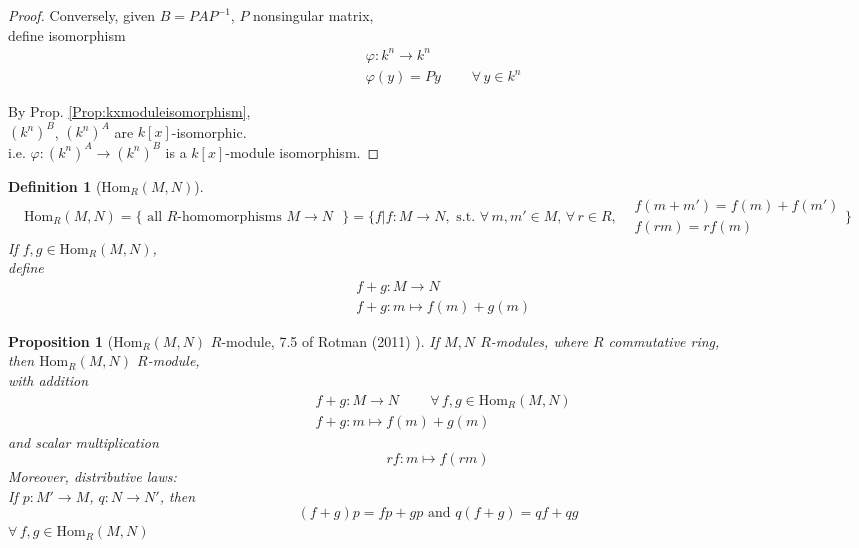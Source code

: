 \documentclass[10pt]{amsart}
\newtheorem{proposition}{Proposition}
\newtheorem{definition}{Definition}
\begin{document}
\begin{multicols*}{2}
\begin{proof}
Conversely, given $B=PAP^{-1}$, $P$ nonsingular matrix,  \\
define isomorphism 
\[
\begin{aligned}
& \varphi :k^n \to k^n \\ 
& \varphi(y) = Py \qquad \  \forall \, y \in k^n
\end{aligned}
\]

By Prop. \ref{Prop:kxmoduleisomorphism}, \\
$(k^n)^B$, $(k^n)^A$ are $k[x]$-isomorphic.  \\
i.e. $\varphi : (k^n)^A \to (k^n)^B $ is a $k[x]$-module isomorphism.  


	\end{proof}

\begin{definition}[$\text{Hom}_R(M,N)$]
\begin{equation}
\text{Hom}_R(M,N) = \lbrace \text{ all $R$-homomorphisms $M\to N$ } \rbrace = \lbrace f | f:M\to N , \text{ s.t. } \forall \, m,m' \in M, \, \forall \, r \in R, \begin{aligned} & f(m+m') =f(m) + f(m') \\ & f(rm) = rf(m) \end{aligned} \rbrace
\end{equation}
If $f,g \in \text{Hom}_R(M,N)$, \\
define
\begin{equation}
\begin{aligned}
& f+g:M \to N \\
& f+g:m\mapsto f(m) + g(m)
\end{aligned}
\end{equation}
\end{definition}

\begin{proposition}[$\text{Hom}_R(M,N)$ $R$-module, 7.5 of Rotman (2011)  \cite{JRotman2010}]
	If $M,N$ $R$-modules, where $R$ commutative ring, \\
	then $\text{Hom}_R(M,N)$ $R$-module, \\
	with addition 
	\[
	\begin{aligned}
	& f+g: M\to N \qquad \  \forall \, f,g \in \text{Hom}_R(M,N) \\
	& f+g:m\mapsto f(m) + g(m)
	\end{aligned}
	\]
and scalar multiplication 
\[
rf:m \mapsto f(rm)
\]
	Moreover, distributive laws: \\
	If $p:M'\to M$, $q:N\to N'$, then 
	\[
	(f+g)p = fp+gp \text{ and } q(f+g) = qf + qg
	\]
$\forall \, f,g \in \text{Hom}_R(M,N)$	
	

\end{proposition}
\end{multicols*}
\end{document}
